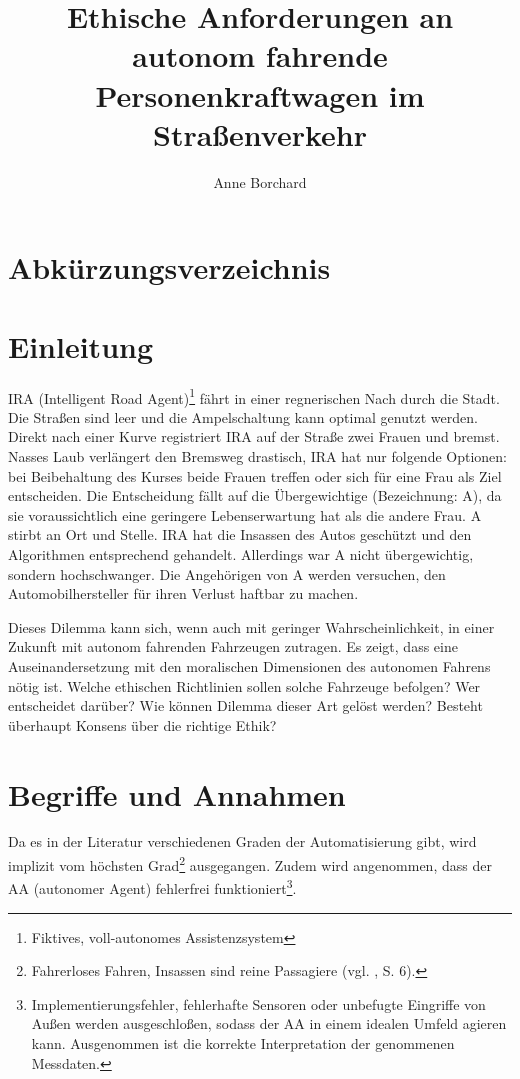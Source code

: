 \documentclass[a4paper, 12pt, titlepage]{scrartcl}
\begin{document}
\author{Anne Borchard}
\title{Ethische Anforderungen an autonom fahrende Personenkraftwagen im Stra\ss enverkehr}
\publishers{Humboldt-Universit\"at zu Berlin}
\maketitle
\tableofcontents
\newpage

\section*{Abk\"urzungsverzeichnis}
\begin{acronym}
\end{acronym}
\newpage

\section{Einleitung}
	IRA (Intelligent Road Agent)\footnote{Fiktives, voll-autonomes Assistenzsystem} fährt in einer regnerischen Nach durch die Stadt. Die Straßen sind leer und die Ampelschaltung kann optimal genutzt werden. Direkt nach einer Kurve registriert IRA auf der Straße zwei Frauen und bremst. Nasses Laub verl\"angert den Bremsweg drastisch, IRA hat nur folgende Optionen: bei Beibehaltung des Kurses beide Frauen treffen oder sich f\"ur eine Frau als Ziel entscheiden. Die Entscheidung fällt auf die \"Ubergewichtige (Bezeichnung: A), da sie voraussichtlich eine geringere Lebenserwartung hat als die andere Frau. A stirbt an Ort und Stelle. IRA hat die Insassen des Autos geschützt und den Algorithmen entsprechend gehandelt. Allerdings war A nicht übergewichtig, sondern hochschwanger. Die Angehörigen von A werden versuchen, den Automobilhersteller für ihren Verlust haftbar zu machen.
	
	Dieses Dilemma kann sich, wenn auch mit geringer Wahrscheinlichkeit, in einer Zukunft mit autonom fahrenden Fahrzeugen zutragen. Es zeigt, dass eine Auseinandersetzung mit den moralischen Dimensionen des autonomen Fahrens n\"otig ist. Welche ethischen Richtlinien sollen solche Fahrzeuge befolgen? Wer entscheidet dar\"uber? Wie k\"onnen Dilemma dieser Art gel\"ost werden? Besteht \"uberhaupt Konsens \"uber die \glqq richtige\grqq{} Ethik?
\section{Begriffe und Annahmen}
	Da es in der Literatur verschiedenen Graden der Automatisierung gibt, wird implizit vom h\"ochsten Grad\footnote{Fahrerloses Fahren, Insassen sind reine Passagiere (vgl. \autocite{bmvi2015}, S. 6).} ausgegangen. Zudem wird angenommen, dass der AA (autonomer Agent) fehlerfrei funktioniert\footnote{Implementierungsfehler, fehlerhafte Sensoren oder unbefugte Eingriffe von Au\ss en werden ausgeschlo\ss en, sodass der AA in einem idealen Umfeld agieren kann. Ausgenommen ist die korrekte Interpretation der genommenen Messdaten.}.
	
\end{document}

